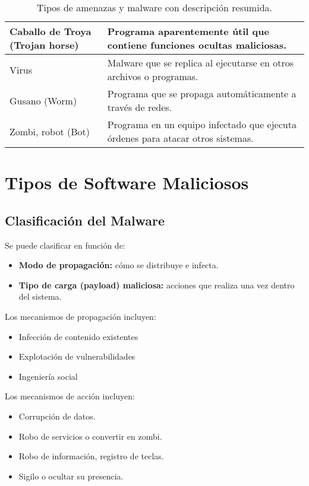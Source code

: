 \documentclass[11pt,a4paper]{article}
\begin{document}
\begin{table}[H]
\begin{tabular}{|p{4cm}|p{10cm}|}
Caballo de Troya (Trojan horse) & Programa aparentemente útil que contiene funciones ocultas maliciosas. \\ \hline
Virus & Malware que se replica al ejecutarse en otros archivos o programas. \\ \hline
Gusano (Worm) & Programa que se propaga automáticamente a través de redes. \\ \hline
Zombi, robot (Bot) & Programa en un equipo infectado que ejecuta órdenes para atacar otros sistemas. \\ \hline
\end{tabular}
\caption{Tipos de amenazas y malware con descripción resumida.}
\end{table}

\section{Tipos de Software Maliciosos}

\subsection{Clasificación del Malware}

Se puede clasificar en función de:
\begin{itemize}
    \item \textbf{Modo de propagación:} cómo se distribuye e infecta.
    \item \textbf{Tipo de carga (payload) maliciosa:} acciones que realiza una vez dentro del sistema.
\end{itemize}

Los mecanismos de propagación incluyen:
\begin{itemize}
    \item Infección de contenido existentes
    \item Explotación de vulnerabilidades
    \item Ingeniería social
\end{itemize}

Los mecanismos de acción incluyen:
\begin{itemize}
    \item Corrupción de datos.
    \item Robo de servicios o convertir en zombi.
    \item Robo de información, registro de teclas.
    \item Sigilo o ocultar su presencia.
\end{itemize}
\end{document}
